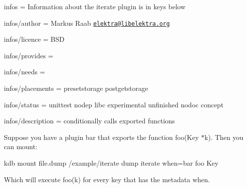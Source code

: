 
\begin{DoxyItemize}
\item infos = Information about the iterate plugin is in keys below
\item infos/author = Markus Raab \href{mailto:elektra@libelektra.org}{\tt elektra@libelektra.\+org}
\item infos/licence = B\+SD
\item infos/provides =
\item infos/needs =
\item infos/placements = presetstorage postgetstorage
\item infos/status = unittest nodep libc experimental unfinished nodoc concept
\item infos/description = conditionally calls exported functions
\end{DoxyItemize}

Suppose you have a plugin bar that exports the function {\ttfamily foo(\+Key $\ast$k)}. Then you can mount\+: \begin{DoxyVerb}kdb mount file.dump /example/iterate dump iterate when=bar foo Key
\end{DoxyVerb}


Which will execute {\ttfamily foo(k)} for every key that has the metadata {\ttfamily when}. 